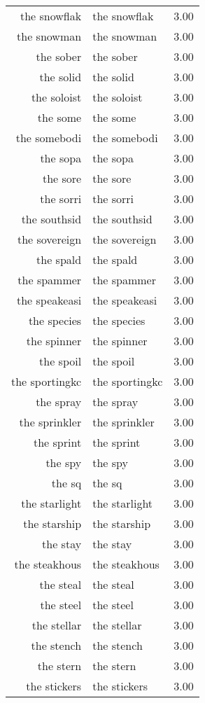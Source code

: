\begin{table}[ht]
\begin{tabular}{rlr}
  the snowflak & the snowflak & 3.00 \\ 
  the snowman & the snowman & 3.00 \\ 
  the sober & the sober & 3.00 \\ 
  the solid & the solid & 3.00 \\ 
  the soloist & the soloist & 3.00 \\ 
  the some & the some & 3.00 \\ 
  the somebodi & the somebodi & 3.00 \\ 
  the sopa & the sopa & 3.00 \\ 
  the sore & the sore & 3.00 \\ 
  the sorri & the sorri & 3.00 \\ 
  the southsid & the southsid & 3.00 \\ 
  the sovereign & the sovereign & 3.00 \\ 
  the spald & the spald & 3.00 \\ 
  the spammer & the spammer & 3.00 \\ 
  the speakeasi & the speakeasi & 3.00 \\ 
  the species & the species & 3.00 \\ 
  the spinner & the spinner & 3.00 \\ 
  the spoil & the spoil & 3.00 \\ 
  the sportingkc & the sportingkc & 3.00 \\ 
  the spray & the spray & 3.00 \\ 
  the sprinkler & the sprinkler & 3.00 \\ 
  the sprint & the sprint & 3.00 \\ 
  the spy & the spy & 3.00 \\ 
  the sq & the sq & 3.00 \\ 
  the starlight & the starlight & 3.00 \\ 
  the starship & the starship & 3.00 \\ 
  the stay & the stay & 3.00 \\ 
  the steakhous & the steakhous & 3.00 \\ 
  the steal & the steal & 3.00 \\ 
  the steel & the steel & 3.00 \\ 
  the stellar & the stellar & 3.00 \\ 
  the stench & the stench & 3.00 \\ 
  the stern & the stern & 3.00 \\ 
  the stickers & the stickers & 3.00 \\ 

\end{tabular}
\end{table}
